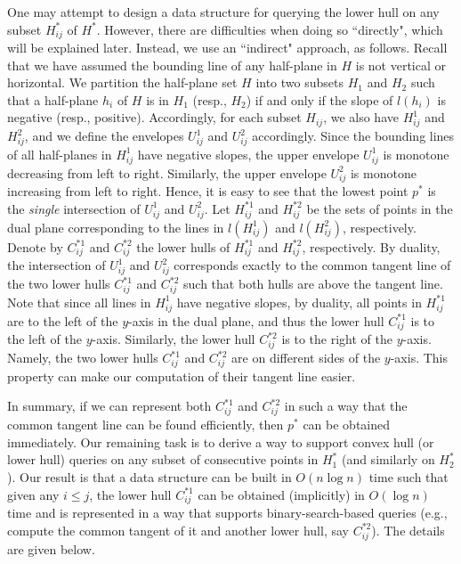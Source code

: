 \documentclass{llncs}
\begin{document}
One may attempt to design a data structure for querying
the lower hull on any subset $H^*_{ij}$ of $H^*$. However,
there are difficulties when doing so ``directly", which will be explained later.
Instead, we use an ``indirect" approach, as follows.
Recall that we have assumed the bounding line of any half-plane in
$H$ is not vertical or horizontal.  We partition the half-plane set $H$ into
two subsets $H_1$ and $H_2$ such that a half-plane $h_i$ of $H$ is in $H_1$ (resp.,
$H_2$) if and only if the slope of $l(h_i)$
is negative (resp., positive). Accordingly, for each
subset $H_{ij}$, we also have $H^1_{ij}$ and $H^2_{ij}$,
and we define the envelopes $U^1_{ij}$ and $U^2_{ij}$ accordingly. Since the
bounding lines of all half-planes in $H^1_{ij}$ have negative slopes,
the upper envelope $U^1_{ij}$ is monotone decreasing from left to
right. Similarly,  the upper envelope $U^2_{ij}$ is monotone
increasing from left to right. Hence, it is easy to see that the
lowest point $p^*$ is the {\em single} intersection of $U^1_{ij}$ and $U^2_{ij}$.
Let $H^{*1}_{ij}$ and $H^{*2}_{ij}$ be the sets of points in the dual plane
corresponding to the lines in $l(H^1_{ij})$ and $l(H^2_{ij})$, respectively.
Denote by $C^{*1}_{ij}$ and $C^{*2}_{ij}$ the lower hulls of
$H^{*1}_{ij}$ and $H^{*2}_{ij}$, respectively. By duality, the
intersection of $U^1_{ij}$ and $U^2_{ij}$ corresponds exactly to the
common tangent line of the two lower hulls $C^{*1}_{ij}$ and
$C^{*2}_{ij}$ such that both hulls are above the tangent line. Note
that since all lines in $H^{1}_{ij}$ have negative slopes, by
duality, all points in $H^{*1}_{ij}$ are to the left of the $y$-axis
in the dual plane, and thus the lower hull $C^{*1}_{ij}$ is to the
left of the $y$-axis. Similarly, the lower hull $C^{*2}_{ij}$ is to
the right of the $y$-axis. Namely, the two lower hulls $C^{*1}_{ij}$
and $C^{*2}_{ij}$ are on different sides of the $y$-axis. This
property can make our computation of their tangent line easier.

In summary,
if we can represent both $C^{*1}_{ij}$ and $C^{*2}_{ij}$ in such a way that
the common tangent line can be found efficiently, then $p^*$
can be obtained immediately. Our remaining task is to derive a way to
support convex hull (or lower hull) queries on any subset of consecutive points in
$H^*_1$ (and similarly
on $H^*_2$). Our result is that a data structure can be built in
$O(n\log n)$ time such that given any $i\leq j$, the lower hull
$C^{*1}_{ij}$ can be obtained (implicitly) in $O(\log n)$ time and is represented
in a way that supports binary-search-based queries (e.g., compute the
common tangent of it and another lower hull, say $C^{*2}_{ij}$). The
details are given below.
\end{document}
